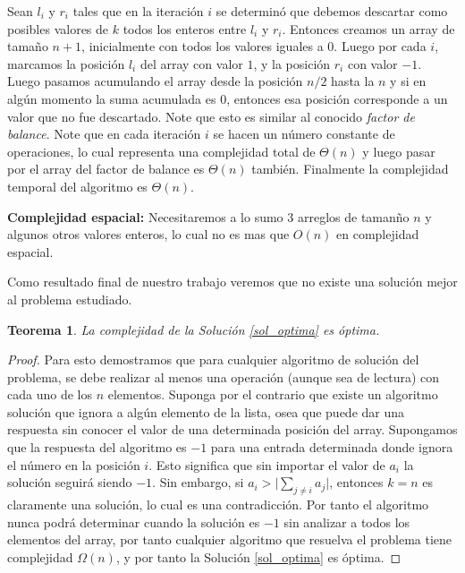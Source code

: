 \documentclass[10pt]{amsart}
\newtheorem{teo}[theorem]{Teorema}
\theoremstyle{definition}
\numberwithin{equation}{section}
\begin{document}
		 Sean $l_i$ y $r_i$ tales que en la iteraci\'on $i$ se determin\'o que debemos descartar como posibles valores de $k$ todos los enteros entre $l_i$ y $r_i$. Entonces creamos un array de tama\~no $n + 1$, inicialmente con todos los valores iguales a $0$. Luego por cada $i$, marcamos la posici\'on $l_i$ del array con valor $1$, y la posici\'on $r_i$ con valor $-1$. Luego pasamos acumulando el array desde la posici\'on $n/2$ hasta la $n$ y si en alg\'un momento la suma acumulada es $0$, entonces esa posici\'on corresponde a un valor que no fue descartado. Note que esto es similar al conocido \emph{factor de balance}. Note que en cada iteraci\'on $i$ se hacen un n\'umero constante de operaciones, lo cual representa una complejidad total de $\Theta(n)$ y luego pasar por el array del factor de balance es $\Theta(n)$ tambi\'en. Finalmente la complejidad temporal del algoritmo es $\Theta(n)$.
		 
		 \textbf{Complejidad espacial:} Necesitaremos a lo sumo $3$ arreglos de taman\~no $n$ y algunos otros valores enteros, lo cual no es mas que $O(n)$ en complejidad espacial. 
		 
		 
		 \medskip
		 Como resultado final de nuestro trabajo veremos que no existe una soluci\'on mejor al problema estudiado.
		 
		 \begin{teo}
		 	La complejidad de la Soluci\'on \ref{sol_optima} es \'optima.
		 \end{teo}
		 
		 \begin{proof}
		 	Para esto demostramos que para cualquier algoritmo de soluci\'on del problema, se debe realizar al menos una operaci\'on (aunque sea de lectura) con cada uno de los $n$ elementos. Suponga por el contrario que existe un algoritmo soluci\'on que ignora a alg\'un elemento de la lista, osea que puede dar una respuesta sin conocer el valor de una determinada posici\'on del array. Supongamos que la respuesta del algoritmo es $-1$ para una entrada determinada donde ignora el n\'umero en la posici\'on $i$. Esto significa que sin importar el valor de $a_i$ la soluci\'on seguir\'a siendo $-1$. Sin embargo, si $a_i > \big| \sum_{j \neq i} a_j \big|$, entonces $k = n$ es claramente una soluci\'on, lo cual es una contradicci\'on. Por tanto el algoritmo nunca podr\'a determinar cuando la soluci\'on es $-1$ sin analizar a todos los elementos del array, por tanto cualquier algoritmo que resuelva el problema tiene complejidad $\Omega(n)$, y por tanto la Soluci\'on \ref{sol_optima} es \'optima.
		 \end{proof}
		 
\end{document}
